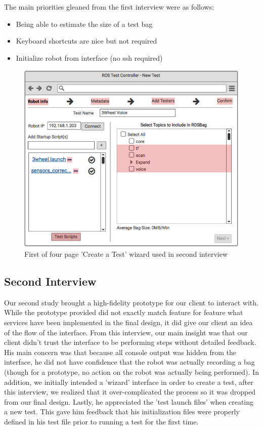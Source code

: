 \documentclass[onecolumn, draftclsnofoot,10pt, compsoc]{IEEEtran}
\begin{document}
The main priorities gleaned from the first interview were as follows:
\begin{itemize}
	\item Being able to estimate the size of a test bag
	\item Keyboard shortcuts are nice but not required
	\item Initialize robot from interface (no ssh required)
\end{itemize}

\begin{figure}
	\centering
	\includegraphics[width=0.5\linewidth]{"Hi-fi mockup of wizard"}
	\caption{First of four page 'Create a Test' wizard used in second interview}
	\label{fig:hi-fi-mockup-of-wizard}
\end{figure}

\subsection{Second Interview}
Our second study brought a high-fidelity prototype for our client to interact with. While the prototype provided did not exactly match feature for feature what services have been implemented in the final design, it did give our client an idea of the flow of the interface.
From this interview, our main insight was that our client didn't trust the interface to be performing steps without detailed feedback. His main concern was that because all console output was hidden from the interface, he did not have confidence that the robot was actually recording a bag (though for a prototype, no action on the robot was actually being performed). In addition, we initially intended a 'wizard' interface in order to create a test, after this interview, we realized that it over-complicated the process so it was dropped from our final design. Lastly, he appreciated the 'test launch files' when creating a new test. This gave him feedback that his initialization files were properly defined in his test file prior to running a test for the first time. 
\end{document}
